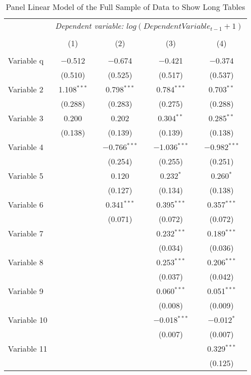 \begin{table*}[htp!] \centering \footnotesize
  \caption{Panel Linear Model of the Full Sample of Data to Show Long Tables} 
  \label{tab:plmdata} 
\begin{tabular}{@{\extracolsep{5pt}}lcccc} 

 & \multicolumn{4}{c}{\textsl{Dependent variable: $log(Dependent Variable_{t-1} + 1)$}} \\ 
\cline{2-5} 
\\[-1.8ex] & (1) & (2) & (3) & (4) \\ 
\hline \\[-1.8ex] 
  Variable q  & $-$0.512 & $-$0.674 & $-$0.421 & $-$0.374 \\ 
  & (0.510) & (0.525) & (0.517) & (0.537) \\ 
  Variable 2 & 1.108$^{***}$ & 0.798$^{***}$ & 0.784$^{***}$ & 0.703$^{**}$ \\ 
  & (0.288) & (0.283) & (0.275) & (0.288) \\ 
  Variable 3  & 0.200 & 0.202 & 0.304$^{**}$ & 0.285$^{**}$ \\ 
  & (0.138) & (0.139) & (0.139) & (0.138) \\ 
  Variable 4 &  & $-$0.766$^{***}$ & $-$1.036$^{***}$ & $-$0.982$^{***}$ \\ 
  &  & (0.254) & (0.255) & (0.251) \\ 
  Variable 5 &  & 0.120 & 0.232$^{*}$ & 0.260$^{*}$ \\ 
  &  & (0.127) & (0.134) & (0.138) \\ 
  Variable 6 &  & 0.341$^{***}$ & 0.395$^{***}$ & 0.357$^{***}$ \\ 
  &  & (0.071) & (0.072) & (0.072) \\  
  Variable 7 &  &  & 0.232$^{***}$ & 0.189$^{***}$ \\ 
  &  &  & (0.034) & (0.036) \\ 
  Variable 8 &  &  & 0.253$^{***}$ & 0.206$^{***}$ \\ 
  &  &  & (0.037) & (0.042) \\ 
  Variable 9 &  &  & 0.060$^{***}$ & 0.051$^{***}$ \\ 
  &  &  & (0.008) & (0.009) \\ 
  Variable 10 &  &  & $-$0.018$^{***}$ & $-$0.012$^{*}$ \\ 
  &  &  & (0.007) & (0.007) \\ 
  Variable 11 &  &  &  & 0.329$^{***}$ \\ 
  &  &  &  & (0.125) \\ 

\end{tabular}
\end{table*}
